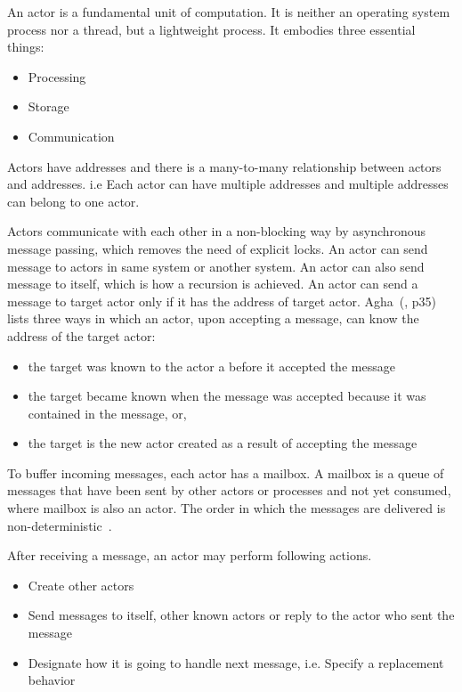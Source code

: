   An actor is a fundamental unit of computation. It is neither an operating system process nor a thread, but a lightweight process. It embodies three essential things:
\begin{itemize}
  \item Processing
  \item Storage
  \item Communication
\end{itemize}
  Actors have addresses and there is a many-to-many relationship between actors and addresses. i.e Each actor can have multiple addresses and multiple addresses can belong to one actor.

  Actors communicate with each other in a non-blocking way by asynchronous message passing, which removes the need of explicit locks. An actor can send message to actors in same system or another system. An actor can also send message to itself, which is how a recursion is achieved. An actor can send a message to target actor only if it has the address of target actor. Agha~(\cite{agha}, p35) lists three ways in which an actor, upon accepting a message, can know the address of the target actor:
  \begin{itemize}
    \item the target was known to the actor a before it accepted the message
    \item the target became known when the message was accepted because it was contained in the message, or,
    \item the target is the new actor created as a result of accepting the message
  \end{itemize}

  To buffer incoming messages, each actor has a mailbox. A mailbox is a queue of messages that have been sent by other actors or processes and not yet consumed, where mailbox is also an actor. The order in which the messages are delivered is non-deterministic~\cite{hewittVideo}.

After receiving a message, an actor may perform following actions.~\parencite{hewitt}
\begin{itemize}
  \item Create other actors
  \item Send messages to itself, other known actors or reply to the actor who sent the message
  \item Designate how it is going to handle next message, i.e. Specify a replacement behavior
\end{itemize}

